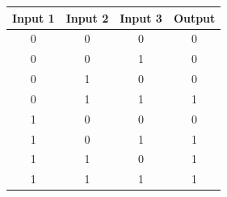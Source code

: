 \begin{figure}[H]
  \begin{subfigure}[t]{.49\columnwidth}
    \begin{tabular}[b]{cccc}
      \hline
    \multicolumn{1}{l}{\textbf{Input 1}} & \multicolumn{1}{l}{\textbf{Input 2}} & \multicolumn{1}{l}{\textbf{Input 3}} & \multicolumn{1}{l}{\textbf{Output}} \\
    \hline
    0 & 0                                    & 0                                    & 0                                   \\
    0 & 0                                    & 1                                    & 0                                   \\
    0 & 1                                    & 0                                    & 0                                   \\
    0 & 1                                    & 1                                    & 1                                   \\
    1 & 0                                    & 0                                    & 0                                   \\
    1 & 0                                    & 1                                    & 1                                   \\
    1 & 1                                    & 0                                    & 1                                   \\
    1 & 1                                    & 1                                    & 1                                   \\


\end{tabular}
\end{subfigure}
\end{figure}

